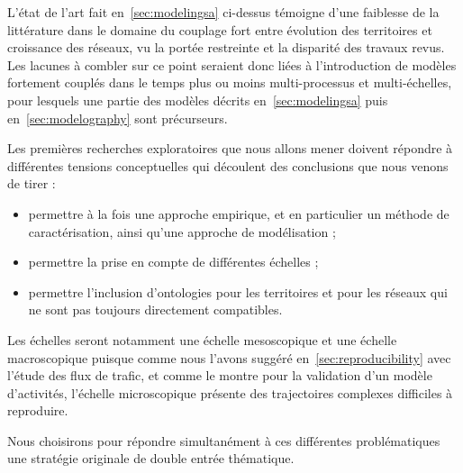 

L'état de l'art fait en~\ref{sec:modelingsa} ci-dessus témoigne d'une faiblesse de la littérature dans le domaine du couplage fort entre évolution des territoires et croissance des réseaux, vu la portée restreinte et la disparité des travaux revus. Les lacunes à combler sur ce point seraient donc liées à l'introduction de modèles fortement couplés dans le temps plus ou moins multi-processus et multi-échelles, pour lesquels une partie des modèles décrits en~\ref{sec:modelingsa} puis en~\ref{sec:modelography} sont précurseurs.


Les premières recherches exploratoires que nous allons mener doivent répondre à différentes tensions conceptuelles qui découlent des conclusions que nous venons de tirer :
\begin{itemize}
	\item permettre à la fois une approche empirique, et en particulier un méthode de caractérisation, ainsi qu'une approche de modélisation ;
	\item permettre la prise en compte de différentes échelles ;
	\item permettre l'inclusion d'ontologies pour les territoires et pour les réseaux qui ne sont pas toujours directement compatibles.
\end{itemize}

Les échelles seront notamment une échelle mesoscopique et une échelle macroscopique puisque comme nous l'avons suggéré en~\ref{sec:reproducibility} avec l'étude des flux de trafic, et comme le montre \cite{yasmin2017macro} pour la validation d'un modèle d'activités, l'échelle microscopique présente des trajectoires complexes difficiles à reproduire.


Nous choisirons pour répondre simultanément à ces différentes problématiques une stratégie originale de double entrée thématique.






